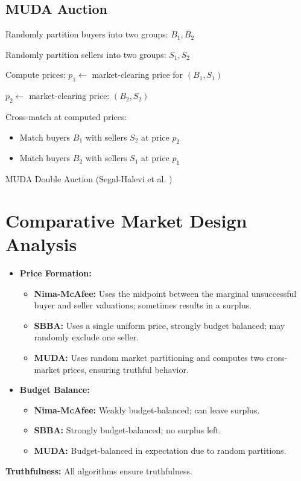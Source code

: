 \documentclass{article}
\begin{document}
\subsection{MUDA Auction}
\begin{algorithm}[htbp]
\DontPrintSemicolon
Randomly partition buyers into two groups: $B_1, B_2$

Randomly partition sellers into two groups: $S_1, S_2$

Compute prices:
$p_1 \leftarrow$ market-clearing price for $(B_1,S_1)$

$p_2 \leftarrow$ market-clearing price:
$(B_2, S_2)$

Cross-match at computed prices:
\begin{itemize}
\item Match buyers $B_1$ with sellers $S_2$ at price $p_2$
\item Match buyers $B_2$ with sellers $S_1$ at price $p_1$
\end{itemize}

\label{alg:muda}
\caption{MUDA Double Auction (Segal-Halevi et al. \cite{SegalHalevi2017MUDA})}
\end{algorithm}

\section{Comparative Market Design Analysis}

\begin{itemize}
    \item \textbf{Price Formation:}
    \begin{itemize}
        \item \textbf{Nima-McAfee:} Uses the midpoint between the marginal unsuccessful buyer and seller valuations; sometimes results in a surplus.
        \item \textbf{SBBA:} Uses a single uniform price, strongly budget balanced; may randomly exclude one seller.
        \item \textbf{MUDA:} Uses random market partitioning and computes two cross-market prices, ensuring truthful behavior.
    \end{itemize}

        \item \textbf{Budget Balance:}
        \begin{itemize}
        \item \textbf{Nima-McAfee:} Weakly budget-balanced; can leave surplus.
        \item \textbf{SBBA:} Strongly budget-balanced; no surplus left.
        \item \textbf{MUDA:} Budget-balanced in expectation due to random partitions.
    \end{itemize}

    \end{itemize}

    \textbf{Truthfulness:} All algorithms ensure truthfulness.
\end{document}
